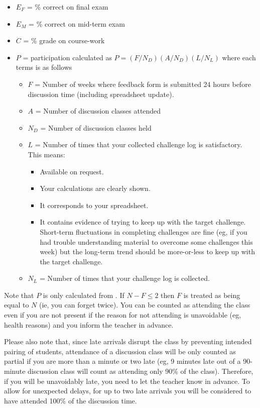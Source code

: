 \begin{itemize}
    \item $E_F$ = \% correct on final exam
    \item $E_M$ = \% correct on mid-term exam
    \item $C$ = \% grade on course-work
    \item $P$ = participation calculated as $P = (F/N_D)(A/N_D)(L/N_L)$ where each terms is as follows
        \begin{itemize}
            \item $F$ = Number of weeks where feedback form is submitted 24 hours before discussion time (including spreadsheet update).
            \item $A$ = Number of discussion classes attended
            \item $N_D$ = Number of discussion classes held
            \item $L$ = Number of times that your collected challenge log is satisfactory. This means:
                \begin{itemize}
                    \item Available on request.
                    \item Your calculations are clearly shown.
                    \item It corresponds to your spreadsheet.
                    \item It contains evidence of trying to keep up with the target challenge. Short-term fluctuations in completing challenges are fine (eg, if you had trouble understanding material to overcome some challenges this week) but the long-term trend should be more-or-less to keep up with the target challenge.
                \end{itemize}
            \item $N_L$ = Number of times that your challenge log is collected.
        \end{itemize}
\end{itemize}

Note that $P$ is only calculated from \assstart. If $N - F \le 2$ then $F$ is treated as being equal to $N$ (ie, you can forget twice). You can be counted as attending the class even if you are not present if the reason for not attending is unavoidable (eg, health reasons) and you inform the teacher in advance.

Please also note that, since late arrivals disrupt the class by preventing intended pairing of students, attendance of a discussion class will be only counted as partial if you are more than a minute or two late (eg, 9 minutes late out of a 90-minute discussion class will count as attending only 90\% of the class). Therefore, if you will be unavoidably late, you need to let the teacher know in advance. To allow for unexpected delays, for up to two late arrivals you will be considered to have attended 100\% of the discussion time.




